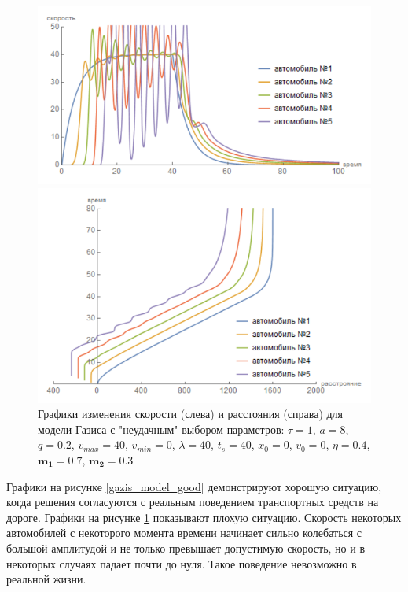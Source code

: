 \documentclass[12pt, a4paper]{extarticle}
\numberwithin{equation}{section}
\begin{document}
\begin{figure}[h!]
	\begin{center}
		\begin{minipage}[h!]{0.48\linewidth}
			\includegraphics[width=1\linewidth,height=0.2\textheight]
			{Images/gazis_model_bad_speed.png}
		\end{minipage}
		\hfill 
		\begin{minipage}[h!]{0.48\linewidth}
			\includegraphics[width=1\linewidth,height=0.2\textheight]
			{Images/gazis_model_bad_distance.png}
		\end{minipage}
		\caption{Графики изменения скорости (слева) и расстояния (справа) для модели Газиса с "неудачным" выбором параметров: $\tau=1$, $a=8$, $q=0.2$, $v_{max}=40$, $v_{min}=0$, $\lambda=40$, $t_s=40$, $x_0=0$, $v_0=0$, $\eta=0.4$, $\boldsymbol{m_1=0.7}$, $\boldsymbol{m_2=0.3}$}
		\label{gazis_model_bad}
	\end{center}
\end{figure}

Графики на рисунке \ref{gazis_model_good} демонстрируют хорошую ситуацию, когда решения согласуются с реальным поведением транспортных средств на дороге. Графики на рисунке \ref{gazis_model_bad} показывают плохую ситуацию. Скорость некоторых автомобилей с некоторого момента времени начинает сильно колебаться с большой амплитудой и не только превышает допустимую скорость, но и в некоторых случаях падает почти до нуля. Такое поведение невозможно в реальной жизни.
\end{document}
